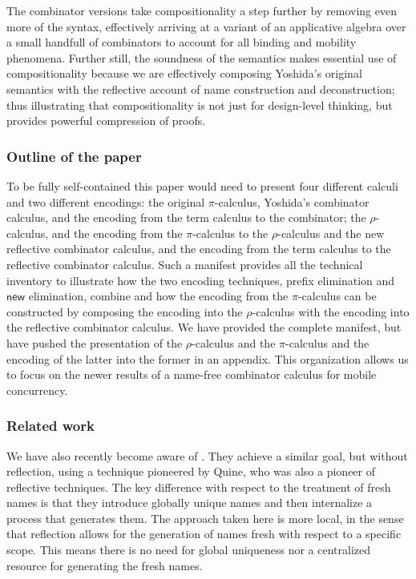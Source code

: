 \documentclass[submission,copyright,creativecommons]{eptcs}
\newcommand{\new}{\mathsf{new}}
\newcommand{\pic}{$\pi$-calculus}
\newcommand{\rhoc}{$\rho$-calculus}
\theoremstyle{definition}
\theoremstyle{remark}
\theoremstyle{remark}
\begin{document}
The combinator versions take compositionality a step further by
removing even more of the syntax, effectively arriving at a variant of
an applicative algebra over a small handfull of combinators to account
for all binding and mobility phenomena. Further still, the soundness
of the semantics makes essential use of compositionality because we
are effectively composing Yoshida's original semantics with the
reflective account of name construction and deconstruction; thus
illustrating that compositionality is not just for design-level
thinking, but provides powerful compression of proofs.

\subsubsection{Outline of the paper}
To be fully self-contained this paper would need to present four
different calculi and two different encodings: the original {\pic},
Yoshida's combinator calculus, and the encoding from the term calculus
to the combinator; the {\rhoc}, and the encoding from the {\pic\;} to
the {\rhoc} and the new reflective combinator calculus, and the
encoding from the term calculus to the reflective combinator
calculus. Such a manifest provides all the technical inventory to
illustrate how the two encoding techniques, prefix elimination and
$\new$ elimination, combine and how the encoding from the {\pic\;} can
be constructed by composing the encoding into the {\rhoc} with the
encoding into the reflective combinator calculus. We have provided the
complete manifest, but have pushed the presentation of the {\rhoc} and
the {\pic\;} and the encoding of the latter into the former in an
appendix. This organization allows us to focus on the newer results of a
name-free combinator calculus for mobile concurrency.

\subsubsection{Related work}

We have also recently become aware of
\cite{DBLP:journals/toplas/RajaS97}. They achieve a similar goal, but
without reflection, using a technique pioneered by Quine, who was also
a pioneer of reflective techniques. \cite{Quine59} \cite{Quine60} The
key difference with respect to the treatment of fresh names is that
they introduce globally unique names and then internalize a process
that generates them. The approach taken here is more local, in the
sense that reflection allows for the generation of names fresh with
respect to a specific scope. This means there is no need for global
uniqueness nor a centralized resource for generating the fresh names.
\end{document}
